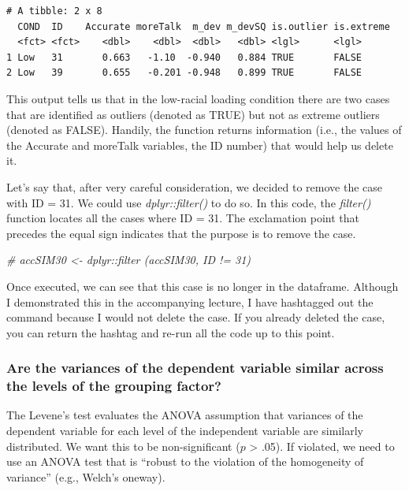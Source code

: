 \documentclass[
  11pt,
]{book}
\newenvironment{Shaded}{\begin{snugshade}}{\end{snugshade}}
\newcommand{\CommentTok}[1]{\textcolor[rgb]{0.37,0.37,0.37}{\textit{#1}}}
\begin{document}
\begin{verbatim}
# A tibble: 2 x 8
  COND  ID    Accurate moreTalk  m_dev m_devSQ is.outlier is.extreme
  <fct> <fct>    <dbl>    <dbl>  <dbl>   <dbl> <lgl>      <lgl>     
1 Low   31       0.663   -1.10  -0.940   0.884 TRUE       FALSE     
2 Low   39       0.655   -0.201 -0.948   0.899 TRUE       FALSE     
\end{verbatim}

This output tells us that in the low-racial loading condition there are two cases that are identified as outliers (denoted as TRUE) but not as extreme outliers (denoted as FALSE). Handily, the function returns information (i.e., the values of the Accurate and moreTalk variables, the ID number) that would help us delete it.

Let's say that, after very careful consideration, we decided to remove the case with ID = 31. We could use \emph{dplyr::filter()} to do so. In this code, the \emph{filter()} function locates all the cases where ID = 31. The exclamation point that precedes the equal sign indicates that the purpose is to remove the case.

\begin{Shaded}
\begin{Highlighting}[]
\CommentTok{\# accSIM30 \textless{}{-} dplyr::filter (accSIM30, ID != \textquotesingle{}31\textquotesingle{})}
\end{Highlighting}
\end{Shaded}

Once executed, we can see that this case is no longer in the dataframe. Although I demonstrated this in the accompanying lecture, I have hashtagged out the command because I would not delete the case. If you already deleted the case, you can return the hashtag and re-run all the code up to this point.

\hypertarget{are-the-variances-of-the-dependent-variable-similar-across-the-levels-of-the-grouping-factor-1}{%
\subsubsection{Are the variances of the dependent variable similar across the levels of the grouping factor?}\label{are-the-variances-of-the-dependent-variable-similar-across-the-levels-of-the-grouping-factor-1}}

The Levene's test evaluates the ANOVA assumption that variances of the dependent variable for each level of the independent variable are similarly distributed. We want this to be non-significant (\(p\) \textgreater{} .05). If violated, we need to use an ANOVA test that is ``robust to the violation of the homogeneity of variance'' (e.g., Welch's oneway).
\end{document}
